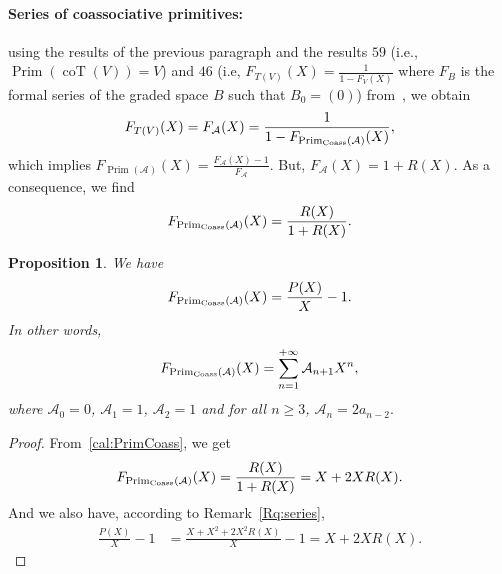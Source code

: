 \documentclass[10pt,a4paper]{amsart}
\numberwithin{equation}{section}
\theoremstyle{definition}
\theoremstyle{plain}
\newtheorem{Prop}[defi]{Proposition}
\DeclareMathOperator{\Prim}{Prim}
\DeclareMathOperator{\coT}{coT}
\begin{document}
\paragraph{Series of coassociative primitives:}

using the results of the previous paragraph and the results $59$ (i.e., $\Prim(\coT(V))=V$) and $46$ (i.e, $F_{T(V)}(X)=\frac{1}{1-F_V(X)}$ where $F_B$ is the formal series of the graded space $B$ such that $B_0=(0)$) from~\cite{algHopf}, we obtain
\begin{align*}
	F_{T(V)}(X)=F_\mathcal{A}(X)=\frac{1}{1-F_{\Prim_{\rm Coass}(\mathcal{A})}(X)},
\end{align*}
which implies $F_{\Prim(\mathcal{A})}(X)=\frac{F_\mathcal{A}(X)-1}{F_\mathcal{A}}.$
But, $F_\mathcal{A}(X)=1+R(X).$ As a consequence, we find
\[
F_{\Prim_{\rm Coass}(\mathcal{A})}(X)=\frac{R(X)}{1+R(X)}.
\]

\begin{Prop}\label{nbcoass}
	We have
	\[
	F_{\Prim_{\rm Coass}(\mathcal{A})}(X)=\frac{P(X)}{X}-1.
	\]
	In other words,
	\[
	F_{\Prim_{\rm Coass}(\mathcal{A})}(X)=\sum_{n=1}^{+\infty} \mathcal{A}_{n+1}X^n,
	\]
	where $\mathcal{A}_0=0$, $\mathcal{A}_1=1$, $\mathcal{A}_2=1$ and for all $n\geq 3$, $\mathcal{A}_n=2a_{n-2}.$
\end{Prop}
\begin{proof}
		From~\eqref{cal:PrimCoass}, we get
\begin{align*}
	F_{\Prim_{\rm Coass}(\mathcal{A})}(X)=\frac{R(X)}{1+R(X)}
						 =X+2XR(X).
\end{align*}
And we also have, according to Remark~\ref{Rq:series},
\begin{align*}
	\frac{P(X)}{X}-1&=\frac{X+X^2+2X^2R(X)}{X}-1=X+2XR(X). \tag*{\qed}
\end{align*}
\renewcommand{\qed}{}
\end{proof}
\end{document}
